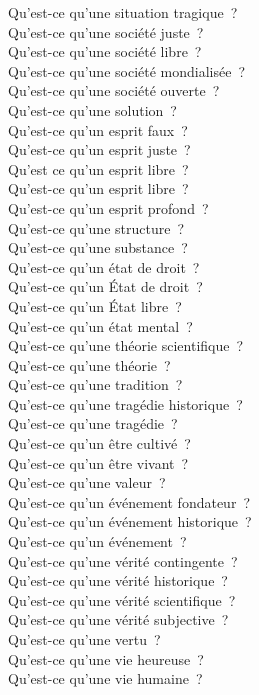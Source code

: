 \documentclass[a4paper,12pt]{article}
\begin{document}
Qu'est-ce qu'une situation tragique ? \\
Qu'est-ce qu'une société juste ? \\
Qu'est-ce qu'une société libre ? \\
Qu'est-ce qu'une société mondialisée ? \\
Qu'est-ce qu'une société ouverte ? \\
Qu'est-ce qu'une solution ? \\
Qu'est-ce qu'un esprit faux ? \\
Qu'est-ce qu'un esprit juste ? \\
Qu'est ce qu'un esprit libre ? \\
Qu'est-ce qu'un esprit libre ? \\
Qu'est-ce qu'un esprit profond ? \\
Qu'est-ce qu'une structure ? \\
Qu'est-ce qu'une substance ? \\
Qu'est-ce qu'un état de droit ? \\
Qu'est-ce qu'un État de droit ? \\
Qu'est-ce qu'un État libre ? \\
Qu'est-ce qu'un état mental ? \\
Qu'est-ce qu'une théorie scientifique ? \\
Qu'est-ce qu'une théorie ? \\
Qu'est-ce qu'une tradition ? \\
Qu'est-ce qu'une tragédie historique ? \\
Qu'est-ce qu'une tragédie ? \\
Qu'est-ce qu'un être cultivé ? \\
Qu'est-ce qu'un être vivant ? \\
Qu'est-ce qu'une valeur ? \\
Qu'est-ce qu'un événement fondateur ? \\
Qu'est-ce qu'un événement historique ? \\
Qu'est-ce qu'un événement ? \\
Qu'est-ce qu'une vérité contingente ? \\
Qu'est-ce qu'une vérité historique ? \\
Qu'est-ce qu'une vérité scientifique ? \\
Qu'est-ce qu'une vérité subjective ? \\
Qu'est-ce qu'une vertu ? \\
Qu'est-ce qu'une vie heureuse ? \\
Qu'est-ce qu'une vie humaine ? \\
\end{document}
